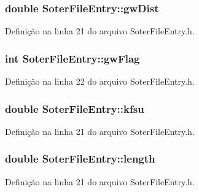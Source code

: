 \subsubsection[{gw\+Dist}]{\setlength{\rightskip}{0pt plus 5cm}double Soter\+File\+Entry\+::gw\+Dist\hspace{0.3cm}{\ttfamily [protected]}}\label{class_soter_file_entry_a5eed4e7f2add6427f71accfd67e74acc}


Definição na linha 21 do arquivo Soter\+File\+Entry.\+h.

\subsubsection[{gw\+Flag}]{\setlength{\rightskip}{0pt plus 5cm}int Soter\+File\+Entry\+::gw\+Flag\hspace{0.3cm}{\ttfamily [protected]}}\label{class_soter_file_entry_a28a78827515594116b68019858a7ae10}


Definição na linha 22 do arquivo Soter\+File\+Entry.\+h.

\subsubsection[{kfsu}]{\setlength{\rightskip}{0pt plus 5cm}double Soter\+File\+Entry\+::kfsu\hspace{0.3cm}{\ttfamily [protected]}}\label{class_soter_file_entry_a36a63f909294aa2256137e4d87c5027c}


Definição na linha 21 do arquivo Soter\+File\+Entry.\+h.

\subsubsection[{length}]{\setlength{\rightskip}{0pt plus 5cm}double Soter\+File\+Entry\+::length\hspace{0.3cm}{\ttfamily [protected]}}\label{class_soter_file_entry_af6584866bd9c850a6524ccffbc65098d}


Definição na linha 21 do arquivo Soter\+File\+Entry.\+h.


